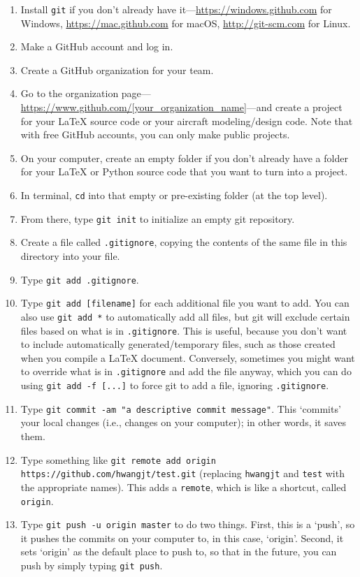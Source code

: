 \documentclass{article}
\begin{document}
\begin{enumerate}
    \item Install \texttt{git} if you don't already have it---\url{https://windows.github.com} for Windows, \url{https://mac.github.com} for macOS, \url{http://git-scm.com} for Linux.
    \item Make a GitHub account and log in.
    \item Create a GitHub organization for your team.
    \item Go to the organization page---\url{https://www.github.com/[your\_organization\_name]}---and create a project for your LaTeX source code or your aircraft modeling/design code. Note that with free GitHub accounts, you can only make public projects.
    \item On your computer, create an empty folder if you don't already have a folder for your LaTeX or Python source code that you want to turn into a project.
    \item In terminal, \texttt{cd} into that empty or pre-existing folder (at the top level).
    \item From there, type \texttt{git init} to initialize an empty git repository.
    \item Create a file called \texttt{.gitignore}, copying the contents of the same file in this directory into your file.
    \item Type \texttt{git add .gitignore}.
    \item Type \texttt{git add [filename]} for each additional file you want to add. You can also use \texttt{git add *} to automatically add all files, but git will exclude certain files based on what is in \texttt{.gitignore}. This is useful, because you don't want to include automatically generated/temporary files, such as those created when you compile a LaTeX document. Conversely, sometimes you might want to override what is in \texttt{.gitignore} and add the file anyway, which you can do using \texttt{git add -f [...]} to force git to add a file, ignoring \texttt{.gitignore}.
    \item Type \texttt{git commit -am "a descriptive commit message"}. This `commits' your local changes (i.e., changes on your computer); in other words, it saves them.
    \item Type something like \texttt{git remote add origin https://github.com/hwangjt/test.git} (replacing \texttt{hwangjt} and \texttt{test} with the appropriate names). This adds a \texttt{remote}, which is like a shortcut, called \texttt{origin}.
    \item Type \texttt{git push -u origin master} to do two things. First, this is a `push', so it pushes the commits on your computer to, in this case, `origin'. Second, it sets `origin' as the default place to push to, so that in the future, you can push by simply typing \texttt{git push}.

\end{enumerate}
\end{document}
